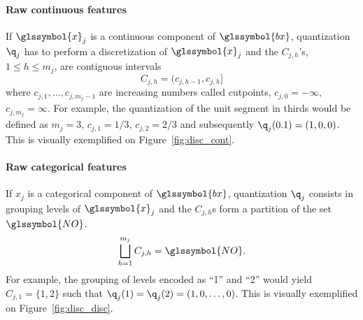 \paragraph{Raw continuous features} If $\glssymbol{x}_j$ is a continuous component of $\glssymbol{bx}$, quantization $\q_j$ has to perform a discretization of $\glssymbol{x}_j$ and the $C_{j,h}$'s, $1\le h\le m_j$, are contiguous intervals  
\begin{equation}\label{eq:Cjhcont}
C_{j,h}=(c_{j,h-1},c_{j,h}]
\end{equation}
where $c_{j,1},\ldots,c_{j,m_j-1}$ are increasing numbers called cutpoints, $c_{j,0}=-\infty$, $c_{j,m_j}=\infty$. For example, the quantization of the unit segment in thirds would be defined as $m_j=3$, $c_{j,1} = 1/3$, $c_{j,2} = 2/3$ and subsequently $\q_j(0.1) = (1,0,0)$. This is visually exemplified on Figure~\ref{fig:disc_cont}.
\paragraph{Raw categorical features} If $x_j$ is a categorical component of $\glssymbol{bx}$, quantization $\q_j$ consists in grouping levels of $\glssymbol{x}_j$ and the $C_{j,h}$s form a partition of the set $\glssymbol{NO}$.
\begin{equation*}
\bigsqcup_{h=1}^{m_j}C_{j,h}=\glssymbol{NO}.
\end{equation*}
For example, the grouping of levels encoded as ``1'' and ``2'' would yield $C_{j,1} = \{1,2\}$ such that $\q_j(1) = \q_j(2) = (1,0,\ldots,0)$. This is visually exemplified on Figure~\ref{fig:disc_disc}.


